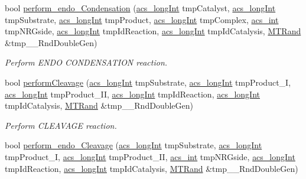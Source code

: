 \begin{DoxyCompactItemize}
bool \hyperlink{a00003_aa7a2cc95d8ba242c805a8fda063b23a7}{perform\-\_\-endo\-\_\-\-Condensation} (\hyperlink{a00016_a19319d75f02db4308bc5c0026d98cd85}{acs\-\_\-long\-Int} tmp\-Catalyst, \hyperlink{a00016_a19319d75f02db4308bc5c0026d98cd85}{acs\-\_\-long\-Int} tmp\-Substrate, \hyperlink{a00016_a19319d75f02db4308bc5c0026d98cd85}{acs\-\_\-long\-Int} tmp\-Product, \hyperlink{a00016_a19319d75f02db4308bc5c0026d98cd85}{acs\-\_\-long\-Int} tmp\-Complex, \hyperlink{a00016_a8d277355641a098190360234e2ebde35}{acs\-\_\-int} tmp\-N\-R\-Gside, \hyperlink{a00016_a19319d75f02db4308bc5c0026d98cd85}{acs\-\_\-long\-Int} tmp\-Id\-Reaction, \hyperlink{a00016_a19319d75f02db4308bc5c0026d98cd85}{acs\-\_\-long\-Int} tmp\-Id\-Catalysis, \hyperlink{a00008}{M\-T\-Rand} \&tmp\-\_\-\-\_\-\-Rnd\-Double\-Gen)
\begin{DoxyCompactList}\small\item\em Perform E\-N\-D\-O C\-O\-N\-D\-E\-N\-S\-A\-T\-I\-O\-N reaction. \end{DoxyCompactList}\item 
bool \hyperlink{a00003_aa4ed307a123c402166cfc7f6ed99043a}{perform\-Cleavage} (\hyperlink{a00016_a19319d75f02db4308bc5c0026d98cd85}{acs\-\_\-long\-Int} tmp\-Substrate, \hyperlink{a00016_a19319d75f02db4308bc5c0026d98cd85}{acs\-\_\-long\-Int} tmp\-Product\-\_\-\-I, \hyperlink{a00016_a19319d75f02db4308bc5c0026d98cd85}{acs\-\_\-long\-Int} tmp\-Product\-\_\-\-I\-I, \hyperlink{a00016_a19319d75f02db4308bc5c0026d98cd85}{acs\-\_\-long\-Int} tmp\-Id\-Reaction, \hyperlink{a00016_a19319d75f02db4308bc5c0026d98cd85}{acs\-\_\-long\-Int} tmp\-Id\-Catalysis, \hyperlink{a00008}{M\-T\-Rand} \&tmp\-\_\-\-\_\-\-Rnd\-Double\-Gen)
\begin{DoxyCompactList}\small\item\em Perform C\-L\-E\-A\-V\-A\-G\-E reaction. \end{DoxyCompactList}\item 
bool \hyperlink{a00003_ade26b82a3b48a5bda7e5751cbfd31b04}{perform\-\_\-endo\-\_\-\-Cleavage} (\hyperlink{a00016_a19319d75f02db4308bc5c0026d98cd85}{acs\-\_\-long\-Int} tmp\-Substrate, \hyperlink{a00016_a19319d75f02db4308bc5c0026d98cd85}{acs\-\_\-long\-Int} tmp\-Product\-\_\-\-I, \hyperlink{a00016_a19319d75f02db4308bc5c0026d98cd85}{acs\-\_\-long\-Int} tmp\-Product\-\_\-\-I\-I, \hyperlink{a00016_a8d277355641a098190360234e2ebde35}{acs\-\_\-int} tmp\-N\-R\-Gside, \hyperlink{a00016_a19319d75f02db4308bc5c0026d98cd85}{acs\-\_\-long\-Int} tmp\-Id\-Reaction, \hyperlink{a00016_a19319d75f02db4308bc5c0026d98cd85}{acs\-\_\-long\-Int} tmp\-Id\-Catalysis, \hyperlink{a00008}{M\-T\-Rand} \&tmp\-\_\-\-\_\-\-Rnd\-Double\-Gen)

\end{DoxyCompactItemize}
